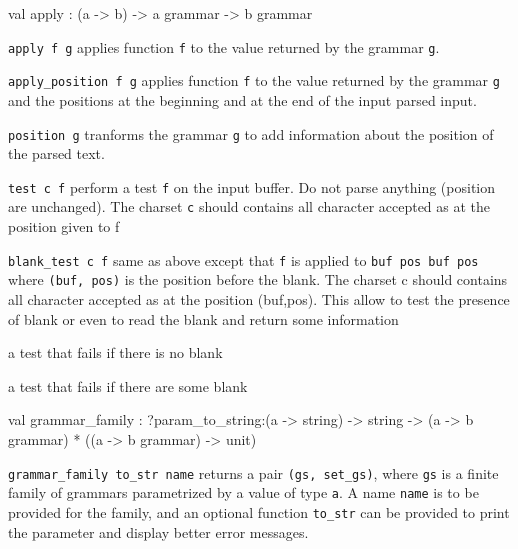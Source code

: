 \documentclass[11pt]{article}
\begin{document}
\label{val:Earley.apply}\begin{ocamldoccode}
val apply : ({\textquotesingle}a -> {\textquotesingle}b) -> {\textquotesingle}a grammar -> {\textquotesingle}b grammar
\end{ocamldoccode}
\begin{ocamldocdescription}
{\tt{apply f g}} applies function {\tt{f}} to the value returned by the grammar
    {\tt{g}}.


\end{ocamldocdescription}




{\tt{apply\_position f g}} applies function {\tt{f}} to the value returned by the
    grammar {\tt{g}} and the positions at the beginning and at the end of the
    input parsed input.



{\tt{position g}} tranforms the grammar {\tt{g}} to add information about the
    position of the parsed text.



{\tt{test c f}} perform a test {\tt{f}} on the input buffer. Do not parse
    anything (position are unchanged). The charset {\tt{c}} should contains
    all character accepted as at the position given to f



{\tt{blank\_test c f}} same as above except that {\tt{f}} is applied to
    {\tt{buf{\textquotesingle} pos{\textquotesingle} buf pos}} where {\tt{(buf{\textquotesingle}, pos{\textquotesingle})}} is the position before the
    blank. The charset c should contains all character accepted as at
    the position (buf,pos). This allow to test the presence of blank
    or even to read the blank and return some information



a test that fails if there is no blank



a test that fails if there are some blank



\label{val:Earley.grammar-underscorefamily}\begin{ocamldoccode}
val grammar_family :
  ?param_to_string:({\textquotesingle}a -> string) ->
  string -> ({\textquotesingle}a -> {\textquotesingle}b grammar) * (({\textquotesingle}a -> {\textquotesingle}b grammar) -> unit)
\end{ocamldoccode}
\begin{ocamldocdescription}
{\tt{grammar\_family to\_str name}} returns a pair {\tt{(gs, set\_gs)}}, where {\tt{gs}}
    is a finite family of grammars parametrized by a value of type {\tt{{\textquotesingle}a}}. A name
    {\tt{name}} is to be provided for the family, and an optional function {\tt{to\_str}}
    can be provided to print the parameter and display better error messages.


\end{ocamldocdescription}
\end{document}
